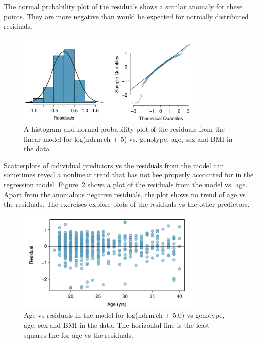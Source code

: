 The normal probability plot of the residuals shows a similar anomaly for these points.  They are more negative than would be expected for normally distributed residuals.



\begin{figure}[h!]
	\centering
	\includegraphics[width=0.8\textwidth]
	{ch_multiple_linear_regression_oi_biostat/figures/logNdrmChResidNormPlot/logNdrmChResidNormPlot.pdf}
	\caption{A histogram and normal probability plot of the residuals from the linear model for log(ndrm.ch + 5) vs. genotype, age, sex and BMI in the  data}
	\label{logNdrmChResidNormPlot}
\end{figure}


Scatterplots of individual predictors vs the residuals from the model can sometimes reveal a nonlinear trend that has not bee properly accounted for in the regression model.  Figure~\ref{logNdrmChAgeVSResidPlot} shows a plot of the residuals from the model vs. age.  Apart from the anomalous negative residuals, the plot shows no trend of age vs the residuals.  The exercises explore plots of the residuals vs the other predictors.

\begin{figure}[h!]
	\centering
	\includegraphics[width=0.8\textwidth]
	{ch_multiple_linear_regression_oi_biostat/figures/logNdrmChAgeVSResidPlot/logNdrmChAgeVSResidPlot.pdf}
	\caption{Age vs residuals in the model for log(ndrm.ch + 5.0) vs genotype, age, sex and BMI in the  data.   The horizontal line is the least squares line for age vs the residuals.}
	\label{logNdrmChAgeVSResidPlot}
\end{figure}


